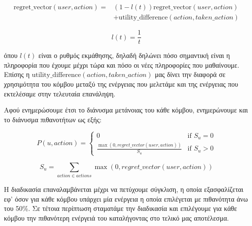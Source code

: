 \begin{equation}
\begin{split}
    \text{regret\_vector}(user, action) =& \left(1 - l(t)\right) \text{regret\_vector}(user, action)\\
    &+ \text{utility\_difference}(action, taken\_action)
\end{split}
\label{eq27}
\end{equation}

\vspace{-3pt}

\[l(t) = \frac{1}{t}\]

\noindent
όπου $l(t)$ είναι ο ρυθμός εκμάθησης, δηλαδή δηλώνει πόσο σημαντική είναι η πληροφορία που έχουμε μέχρι τώρα και πόσο οι νέες πληροφορίες που μαθαίνουμε. Επίσης η $\text{utility\_difference}(action, taken\_action)$ μας δίνει την διαφορά σε χρησιμότητα του κόμβου μεταξύ της ενέργειας που μελετάμε και της ενέργειας που εκτελέσαμε στην τελευταία επανάληψη. 

Αφού ενημερώσουμε έτσι το διάνυσμα μετάνοιας του κάθε κόμβου, ενημερώνουμε και το διάνυσμα πιθανοτήτων ως εξής:

\vspace{-5pt}

\begin{equation}
P(u,action) =
\begin{cases}
    0 & \text{if } S_u = 0 \\
    \frac{\max(0, regret\_vector(user, action))}{S_u} & \text{if } S_u > 0
\end{cases}
\label{eq28}
\end{equation}

\vspace{-3pt}

\[S_u = \sum_{action \in actions} \max(0, regret\_vector(user, action))\]

Η διαδικασία επαναλαμβάνεται μέχρι να πετύχουμε σύγκλιση, η οποία εξασφαλίζεται εφ' όσον για κάθε κόμβου υπάρχει μία ενέργεια η οποία επιλέγεται με πιθανότητα άνω του 50\%. Σε τέτοια περίπτωση σταματάμε την διαδικασία και επιλέγουμε για κάθε κόμβου την πιθανότερη ενέργειά του καταλήγοντας στο τελικό μας αποτέλεσμα.

